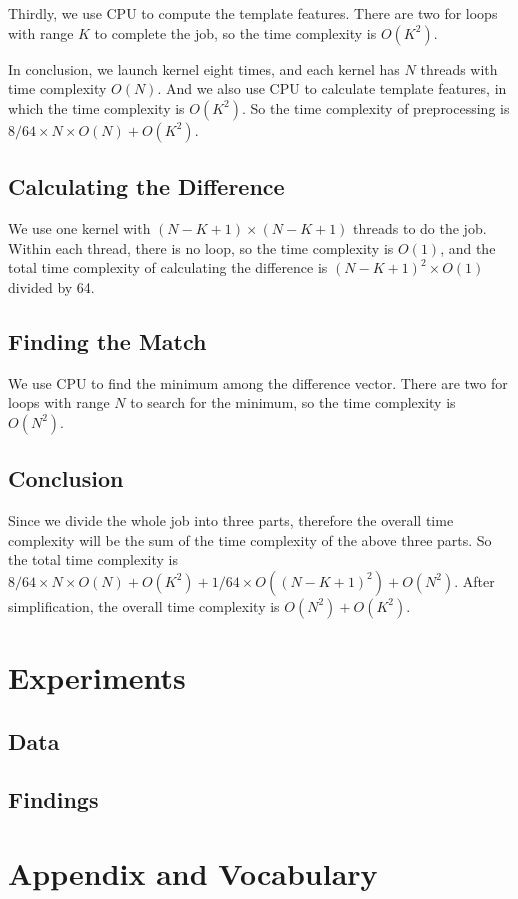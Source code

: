 \documentclass[12pt, a4paper]{article}
\begin{document}
    Thirdly, we use CPU to compute the template features. There are two for loops
    with range $K$ to complete the job, so the time complexity is $O(K^2)$.

    In conclusion, we launch kernel eight times, and each kernel has $N$ threads with
    time complexity $O(N)$. And we also use CPU to calculate template features, in which
    the time complexity is $O(K^2)$. So the time complexity of preprocessing is
    $8/64 \times N \times O(N) + O(K^2)$.
  \subsection{Calculating the Difference}
    We use one kernel with $(N - K + 1) \times (N - K + 1)$ threads to do the job.
    Within each thread, there is no loop, so the time complexity is $O(1)$, and the
    total time complexity of calculating the difference is $(N - K + 1) ^ 2 \times O(1)$ divided by 64.
  \subsection{Finding the Match}
    We use CPU to find the minimum among the difference vector. There are two for
    loops with range $N$ to search for the minimum, so the time complexity is $O(N ^ 2)$.
  \subsection{Conclusion}
    Since we divide the whole job into three parts, therefore the overall time complexity
    will be the sum of the time complexity of the above three parts. So the total
    time complexity is $8/64 \times N \times O(N) + O(K^2) + 1/64 \times O((N - K + 1) ^ 2) + O(N ^ 2)$.
    After simplification, the overall time complexity is $O(N ^ 2) + O(K ^ 2)$.


\section{Experiments}
  \subsection{Data}
  \subsection{Findings}
\section{Appendix and Vocabulary}
\end{document}
